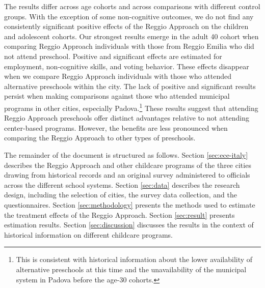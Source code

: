 The results differ across age cohorts and across comparisons with different control groups. With the exception of some non-cognitive outcomes, we do not find any consistently significant positive effects of the Reggio Approach on the children and adolescent cohorts. Our strongest results emerge in the adult 40 cohort when comparing Reggio Approach individuals with those from Reggio Emilia who did not attend preschool. Positive and significant effects are estimated for employment, non-cognitive skills, and voting behavior. These effects disappear when we compare Reggio Approach individuals with those who attended alternative preschools within the city. The lack of positive and significant results persist when making comparisons against those who attended municipal programs in other cities, especially Padova.\footnote{This is consistent with historical information about the lower availability of alternative preschools at this time and the unavailability of the municipal system in Padova before the age-30 cohorts.} These results suggest that attending Reggio Approach preschools offer distinct advantages relative to not attending center-based programs. However, the benefits are less pronounced when comparing the Reggio Approach to other types of preschools. 

The remainder of the document is structured as follows. Section \ref{sec:ece-italy} describes the Reggio Approach and other childcare programs of the three cities drawing from historical records and an original survey administered to officials across the different school systems. Section \ref{sec:data} describes the research design, including the selection of cities, the survey data collection, and the questionnaires. Section \ref{sec:methodology} presents the methods used to estimate the treatment effects of the Reggio Approach. Section \ref{sec:result} presents estimation results. Section \ref{sec:discussion} discusses the results in the context of historical information on different childcare programs. 

